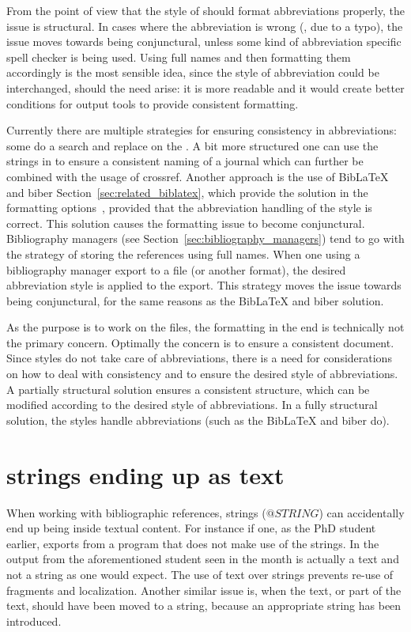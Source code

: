 From the point of view that the style of {\bibtex} should format
abbreviations properly, the issue is structural.  In cases where the
abbreviation is wrong (\eg, due to a typo), the issue moves towards
being conjunctural, unless some kind of abbreviation specific spell
checker is being used.  Using full names and then formatting them
accordingly is the most sensible idea, since the style of abbreviation
could be interchanged, should the need arise: it is more readable and
it would create better conditions for output tools to provide
consistent formatting.

Currently there are multiple strategies for ensuring consistency in
abbreviations: some do a search and replace on the .  A bit
more structured one can use the strings in {\bibtex} to ensure a
consistent naming of a journal which can further be combined with the
usage of crossref.  Another approach is the use of Bib{\LaTeX} and
biber Section~\ref{sec:related_biblatex}, which provide the solution
in the formatting options~\cite{koppensteiner2011abbreviate}, provided
that the abbreviation handling of the style is correct.  This solution
causes the formatting issue to become conjunctural.  Bibliography
managers (see Section~\ref{sec:bibliography_managers}) tend to go with
the strategy of storing the references using full names.  When one
using a bibliography manager export to a {\bibtex} file (or another
format), the desired abbreviation style is applied to the export.
This strategy moves the issue towards being conjunctural, for the same
reasons as the Bib{\LaTeX} and biber solution.

As the purpose is to work on the {\bibtex} files, the formatting in
the end is technically not the primary concern.  Optimally the concern
is to ensure a consistent document.  Since {\bibtex} styles do not
take care of abbreviations, there is a need for considerations on how
to deal with consistency and to ensure the desired style of
abbreviations.  A partially structural solution ensures a consistent
structure, which can be modified according to the desired style of
abbreviations.  In a fully structural solution, the styles handle
abbreviations (such as the Bib{\LaTeX} and biber do).


\section{{\bibtex} strings ending up as text}
\label{sec:problems_strings_as_text}

When working with bibliographic references, {\bibtex} strings
($@STRING$) can accidentally end up being inside textual content.  For
instance if one, as the PhD student earlier, exports from a program
that does not make use of the strings.  In the output from the
aforementioned student seen in  the month
is actually a text and not a string as one would expect.  The use of
text over strings prevents re-use of fragments and localization.
Another similar issue is, when the text, or part of the text, should
have been moved to a string, because an appropriate string has been
introduced.

